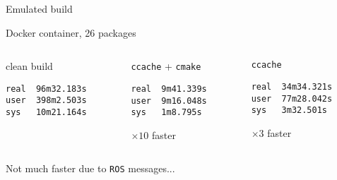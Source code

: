 \documentclass[hyperref={colorlinks=false, breaklinks=true},11pt]{beamer}
\begin{document}
\begin{frame}[fragile]{Emulated build}
    \begin{block}{Docker container, 26 packages}
        \vspace{3mm}
        \begin{columns}[T]
            \begin{column}{.3\textwidth}
                clean build
\begin{verbatim}
real  96m32.183s
user  398m2.503s
sys   10m21.164s
\end{verbatim}
            \end{column}
            \begin{column}{.3\textwidth}
                \texttt{ccache} + \texttt{cmake}
\begin{verbatim}
real  9m41.339s
user  9m16.048s
sys   1m8.795s
\end{verbatim}
$\times 10$ faster
            \end{column}
            \begin{column}{.3\textwidth}
                \texttt{ccache}
\begin{verbatim}
real  34m34.321s
user  77m28.042s
sys   3m32.501s
\end{verbatim}
$\times 3$ faster
            \end{column}
        \end{columns}
    \end{block}

    \begin{block}{}
        Not much faster due to \texttt{ROS} messages...
    \end{block}
\end{frame}
\end{document}

